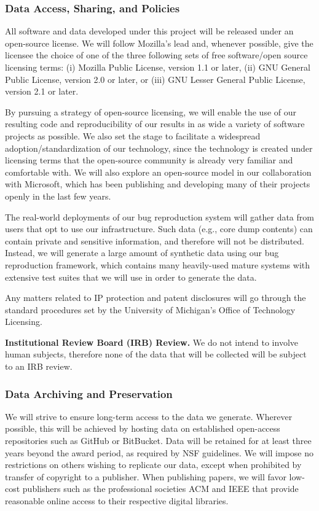 \documentclass{article}
\begin{document}
\subsubsection*{Data Access, Sharing, and Policies}

All software and data developed under this project will be released under an
open-source license. We will follow Mozilla's lead and, whenever
possible, give the licensee the choice of one of the three following sets of free software/open
source licensing terms: (i) Mozilla Public License, version 1.1 or later, (ii)
GNU General Public License, version 2.0 or later, or (iii) GNU Lesser General
Public License, version 2.1 or later.

By pursuing a strategy of open-source licensing, we will enable the use of our
resulting code and reproducibility of our results in as wide a variety of
software projects as possible. We also set the stage to facilitate a widespread
adoption/standardization of our technology, since the technology is created
under licensing terms that the open-source community is already very familiar
and comfortable with. We will also explore an open-source model in our collaboration with Microsoft, which has been publishing and developing many of their projects openly in the last few years.

The real-world deployments of our bug reproduction system will gather data from users that opt to use our infrastructure. Such data (e.g., core dump contents) can contain private and sensitive information, and therefore will not be distributed. Instead, we will generate a large amount of synthetic data using our bug reproduction framework, which contains many heavily-used mature systems with extensive test suites that we will use in order to generate the data. 

Any matters related to IP protection and patent disclosures will go through the standard procedures set by the University of Michigan's Office of Technology Licensing.


\textbf{Institutional Review Board (IRB) Review.} We do not intend to involve human subjects, therefore none of the data that will be collected will be subject to an IRB review.


\subsubsection*{Data Archiving and Preservation}

We will strive to ensure long-term access to the data we generate. Wherever
possible, this will be achieved by hosting data on established open-access
repositories such as GitHub or BitBucket. Data will be retained for at least three years beyond the award period, as required by NSF guidelines. We will impose no restrictions on
others wishing to replicate our data, except when prohibited by transfer of
copyright to a publisher. When publishing papers, we will favor low-cost
publishers such as the professional societies ACM and IEEE that provide
reasonable online access to their respective digital libraries.
\end{document}
